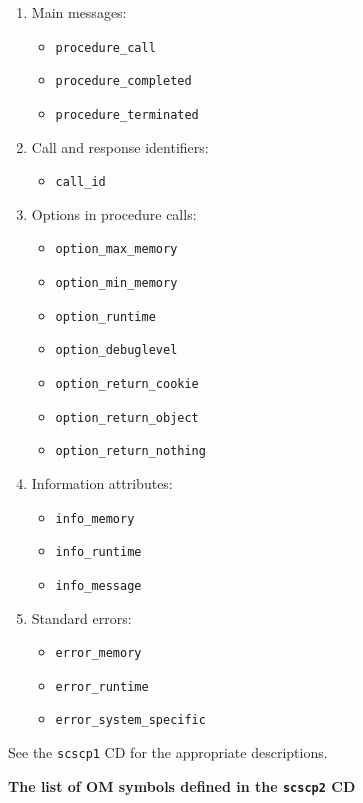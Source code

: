 \documentclass{amsart}
\begin{document}
\begin{enumerate}
\item Main messages:
\begin{itemize}
\item \verb|procedure_call|
\item \verb|procedure_completed|
\item \verb|procedure_terminated|
\end{itemize}
\item Call and response identifiers:
\begin{itemize}
\item \verb|call_id|
\end{itemize}
\item Options in procedure calls:
\begin{itemize}
\item \verb|option_max_memory|
\item \verb|option_min_memory|
\item \verb|option_runtime|
\item \verb|option_debuglevel|
\item \verb|option_return_cookie|
\item \verb|option_return_object| 
\item \verb|option_return_nothing| 
\end{itemize}
\item Information attributes:
\begin{itemize}
\item \verb|info_memory|
\item \verb|info_runtime|
\item \verb|info_message|
\end{itemize}
\item Standard errors:
\begin{itemize}
\item \verb|error_memory|
\item \verb|error_runtime|
\item \verb|error_system_specific|
\end{itemize}
\end{enumerate}

\noindent See the {\tt scscp1} CD \cite{scscp1} for the appropriate descriptions.

\newpage

\centerline{ \bf {The list of OM symbols defined in the {\tt scscp2} CD}}

\vspace{10pt}
\end{document}
